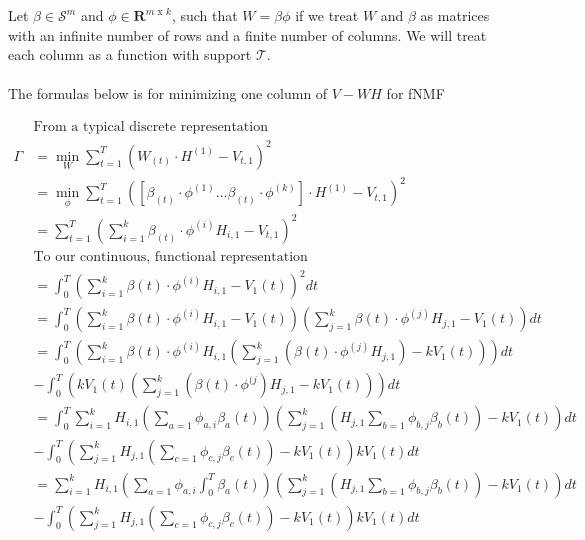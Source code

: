 \documentclass{amsart}
\begin{document}
  Let $\beta \in \mathcal{S}^m$ and $\phi \in \mathbf{R}^{m \text{ x } k}$, such that $W = \beta \phi$ if we treat $W$ and $\beta$ as matrices with an infinite number of rows and a finite number of columns. We will treat each column as a function with support $\mathcal{T}$.

  \paragraph{}

  The formulas below is for minimizing one column of $V - W H$ for fNMF


  \clearpage

  \begin{align*}
    & \text{From a typical discrete representation} \\
    \Gamma & = \min_W \sum_{t=1}^T (W_{(t)} \cdot H^{(1)} - V_{t,1})^2\\
    & = \min_{\phi} \sum_{t=1}^T ([\beta_{(t)} \cdot \phi^{(1)} \ldots \beta_{(t)} \cdot \phi^{(k)}] \cdot H^{(1)} - V_{t,1})^2\\
    & = \sum_{t=1}^T \left( \sum_{i=1}^k \beta_{(t)} \cdot \phi^{(i)} H_{i,1} - V_{t,1} \right)^2\\
    & \text{To our continuous, functional representation} \\
    & = \int_0^T \left(\sum_{i=1}^k \beta(t) \cdot \phi^{(i)} H_{i,1} - V_1(t) \right)^2 dt\\
    & = \int_0^T \left(\sum_{i=1}^k \beta(t) \cdot \phi^{(i)} H_{i,1} - V_1(t) \right) \left(\sum_{j=1}^k \beta(t) \cdot \phi^{(j)} H_{j,1} - V_1(t) \right) dt\\
    & = \int_0^T \left( \sum_{i=1}^k \beta(t) \cdot \phi^{(i)} H_{i,1} \left( \sum_{j=1}^k \left( \beta(t) \cdot \phi^{(j)} H_{j,1} \right) - k V_1(t) \right) \right) dt\\
    & - \int_0^T \left( k V_1(t) \left( \sum_{j=1}^k \left(\beta(t) \cdot \phi^{(j} \right) H_{j,1} - k V_1(t) \right) \right) dt\\
    & = \int_0^T \sum_{i=1}^k H_{i,1} \left(\sum_{a=1} \phi_{a,i} \beta_a(t) \right) \left(\sum_{j=1}^k \left( H_{j,1} \sum_{b=1} \phi_{b,j} \beta_b(t) \right) - k V_1(t) \right) dt\\
    & - \int_0^T \left(\sum_{j=1}^k H_{j,1} \left(\sum_{c=1} \phi_{c,j} \beta_c(t) \right) - k V_1(t) \right) k V_1(t) dt\\
    & = \sum_{i=1}^k H_{i,1} \left(\sum_{a=1} \phi_{a,i} \int_0^T \beta_a(t) \right) \left(\sum_{j=1}^k \left(H_{j,1} \sum_{b=1} \phi_{b,j} \beta_b(t) \right) - k V_1(t) \right) dt\\
    & - \int_0^T \left(\sum_{j=1}^k H_{j,1} \left(\sum_{c=1} \phi_{c,j} \beta_c(t) \right) - k V_1(t) \right) k V_1(t) dt\\
  \end{align*}
\end{document}
